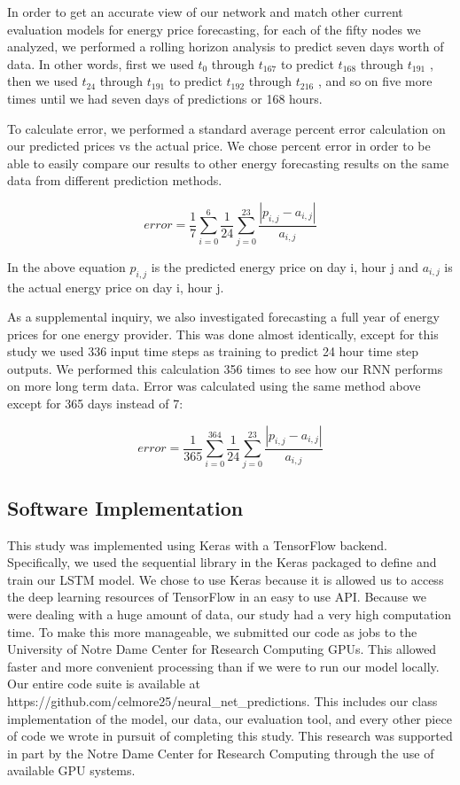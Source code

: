 \documentclass[sigconf]{acmart}
\begin{document}
In order to get an accurate view of our network and match other current evaluation models for energy price forecasting, for each of the fifty nodes we analyzed, we performed a rolling horizon analysis to predict seven days worth of data. In other words, first we used $t_{0}$ through $t_{167}$ to predict $t_{168}$ through $t_{191}$ , then we used $t_{24}$ through $t_{191}$ to predict $t_{192}$ through $t_{216}$ , and so on five more times until we had seven days of predictions or 168 hours.

To calculate error, we performed a standard average percent error calculation on our predicted prices vs the actual price. We chose percent error in order to be able to easily compare our results to other energy forecasting results on the same data from different prediction methods.

\begin{equation}
error = \frac{1}{7}\sum_{i=0}^{6}\frac{1}{24}\sum_{j=0}^{23}\frac{|p_{i,j}-a_{i,j}|}{a_{i,j}}
\end{equation}

In the above equation $p_{i,j}$ is the predicted energy price on day i, hour j and $a_{i,j}$ is the actual energy price on day i, hour j.

As a supplemental inquiry, we also investigated forecasting a full year of energy prices for one energy provider. This was done almost identically, except for this study we used 336 input time steps as training to predict 24 hour time step outputs. We performed this calculation 356 times to see how our RNN performs on more long term data. Error was calculated using the same method above except for 365 days instead of 7:

\begin{equation}
error = \frac{1}{365}\sum_{i=0}^{364}\frac{1}{24}\sum_{j=0}^{23}\frac{|p_{i,j}-a_{i,j}|}{a_{i,j}}
\end{equation}


\subsection{Software Implementation}
This study was implemented using Keras with a TensorFlow backend. Specifically, we used the sequential library in the Keras packaged to define and train our LSTM model. We chose to use Keras because it is allowed us to access the deep learning resources of TensorFlow in an easy to use API. Because we were dealing with a huge amount of data, our study had a very high computation time. To make this more manageable, we submitted our code as jobs to the University of Notre Dame Center for Research Computing GPUs. This allowed faster and more convenient processing than if we were to run our model locally. Our entire code suite  is available at https://github.com/celmore25/neural\_net\_predictions. This includes our class implementation of the model, our data, our evaluation tool, and every other piece of code we wrote in pursuit of completing this study. This research was supported in part by the Notre Dame Center for Research Computing through the use of available GPU systems. 
\end{document}
